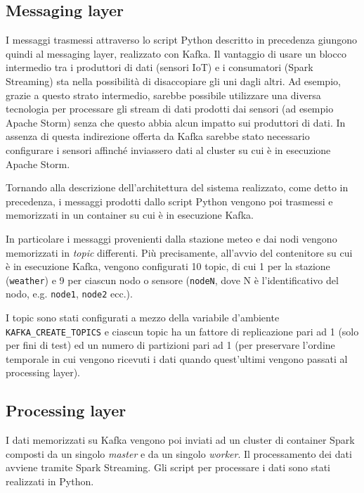 \subsection{Messaging layer}
I messaggi trasmessi attraverso lo script Python descritto in precedenza giungono quindi al messaging layer, realizzato con Kafka. Il vantaggio di usare un blocco intermedio tra i produttori di dati (sensori IoT) e i consumatori (Spark Streaming) sta nella possibilità di disaccopiare gli uni dagli altri. Ad esempio, grazie a questo strato intermedio, sarebbe possibile utilizzare una diversa tecnologia per processare gli stream di dati prodotti dai sensori (ad esempio Apache Storm) senza che questo abbia alcun impatto sui produttori di dati. In assenza di questa indirezione offerta da Kafka sarebbe stato necessario configurare i sensori affinché inviassero dati al cluster su cui è in esecuzione Apache Storm.\par

Tornando alla descrizione dell'architettura del sistema realizzato, come detto in precedenza, i messaggi prodotti dallo script Python vengono poi trasmessi e memorizzati in un container su cui è in esecuzione Kafka.\par

In particolare i messaggi provenienti dalla stazione meteo e dai nodi vengono memorizzati in \textit{topic} differenti. Più precisamente, all'avvio del contenitore su cui è in esecuzione Kafka, vengono configurati 10 topic, di cui 1 per la stazione (\texttt{weather}) e 9 per ciascun nodo o sensore (\texttt{nodeN}, dove N è l'identificativo del nodo, e.g. \texttt{node1}, \texttt{node2} ecc.).\par

I topic sono stati configurati a mezzo della variabile d'ambiente \\ \texttt{KAFKA\_CREATE\_TOPICS} e ciascun topic ha un fattore di replicazione pari ad 1 (solo per fini di test) ed un numero di partizioni pari ad 1 (per preservare l'ordine temporale in cui vengono ricevuti i dati quando quest'ultimi vengono passati al processing layer).

\subsection{Processing layer}
I dati memorizzati su Kafka vengono poi inviati ad un cluster di container Spark composti da un singolo \textit{master} e da un singolo \textit{worker}. Il processamento dei dati avviene tramite Spark Streaming. Gli script per processare i dati sono stati realizzati in Python.\par

